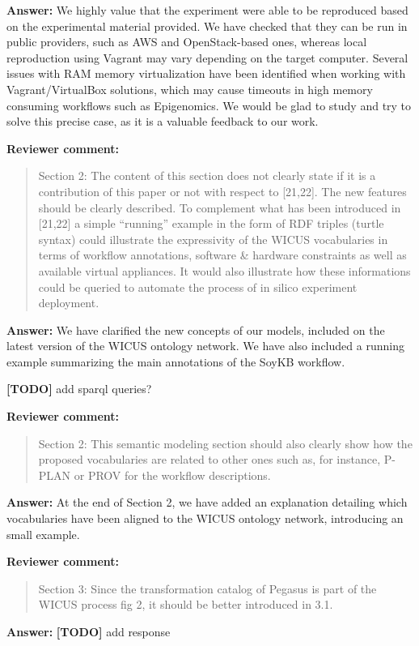 \documentclass{letter}
\newenvironment{review}%
{\textbf{Reviewer comment:}\begin{quote}}%
{\end{quote}}%
\newcommand{\todo}[1]{%
      \color{red}\textbf{[TODO]} #1\color{black}}
\newcommand{\answer}[1]{%
      \textbf{Answer:} #1}
\begin{document}
\begin{letter}{}
\answer{We highly value that the experiment were able to be reproduced based on the experimental material provided. We have checked that they can be run in public providers, such as AWS and OpenStack-based ones, whereas local reproduction using Vagrant may vary depending on the target computer. Several issues with RAM memory virtualization have been identified when working with Vagrant/VirtualBox solutions, which may cause timeouts in high memory consuming workflows such as Epigenomics. We would be glad to study and try to solve this precise case, as it is a valuable feedback to our work.}


\begin{review}
Section 2: The content of this section does not clearly state if it is a contribution of this paper or not with respect to [21,22]. The new features should be clearly described. To complement what has been introduced in [21,22] a simple ``running'' example in the form of RDF triples (turtle syntax) could illustrate the expressivity of the WICUS vocabularies in terms of workflow annotations, software \& hardware constraints as well as available virtual appliances. It would also illustrate how these informations could be queried to automate the process of in silico experiment deployment.
\end{review}

\answer{We have clarified the new concepts of our models, included on the latest version of the WICUS ontology network. We have also included a running example summarizing the main annotations of the SoyKB workflow.}

\todo{add sparql queries?}


\begin{review}
Section 2: This semantic modeling section should also clearly show how the proposed vocabularies are related to other ones such as, for instance, P-PLAN or PROV for the workflow descriptions.
\end{review}

\answer{At the end of Section 2, we have added an explanation detailing which vocabularies have been aligned to the WICUS ontology network, introducing an small example.}


\begin{review}
Section 3: Since the transformation catalog of Pegasus is part of the WICUS process fig 2, it should be better introduced in 3.1.
\end{review}

\answer{\todo{add response}}



\end{letter}
\end{document}
